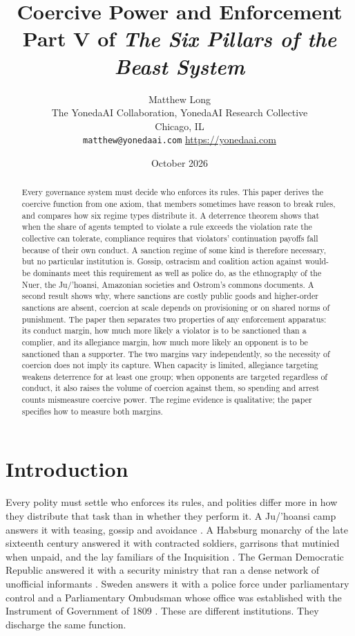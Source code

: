 \documentclass[11pt,letterpaper]{article}
\title{Coercive Power and Enforcement\\[4pt]
  {\normalsize Part V of \emph{The Six Pillars of the Beast System}}}
\author{Matthew Long\\
  \small The YonedaAI Collaboration, YonedaAI Research Collective\\
  \small Chicago, IL\\
  \small \texttt{matthew@yonedaai.com} \quad \url{https://yonedaai.com}}
\date{October 2026}
\theoremstyle{definition}
\theoremstyle{remark}
\begin{document}
\maketitle

\begin{abstract}
Every governance system must decide who enforces its rules. This paper derives the coercive function from one axiom, that members sometimes have reason to break rules, and compares how six regime types distribute it. A deterrence theorem shows that when the share of agents tempted to violate a rule exceeds the violation rate the collective can tolerate, compliance requires that violators' continuation payoffs fall because of their own conduct. A sanction regime of some kind is therefore necessary, but no particular institution is. Gossip, ostracism and coalition action against would-be dominants meet this requirement as well as police do, as the ethnography of the Nuer, the Ju/'hoansi, Amazonian societies and Ostrom's commons documents. A second result shows why, where sanctions are costly public goods and higher-order sanctions are absent, coercion at scale depends on provisioning or on shared norms of punishment. The paper then separates two properties of any enforcement apparatus: its conduct margin, how much more likely a violator is to be sanctioned than a complier, and its allegiance margin, how much more likely an opponent is to be sanctioned than a supporter. The two margins vary independently, so the necessity of coercion does not imply its capture. When capacity is limited, allegiance targeting weakens deterrence for at least one group; when opponents are targeted regardless of conduct, it also raises the volume of coercion against them, so spending and arrest counts mismeasure coercive power. The regime evidence is qualitative; the paper specifies how to measure both margins.
\end{abstract}

\section{Introduction}
\label{sec:intro}

Every polity must settle who enforces its rules, and polities differ more in how they distribute that task than in whether they perform it. A Ju/'hoansi camp answers it with teasing, gossip and avoidance \citep{lee2013,wiessner2005}. A Habsburg monarchy of the late sixteenth century answered it with contracted soldiers, garrisons that mutinied when unpaid, and the lay familiars of the Inquisition \citep{parker1972,thompson1976,kamen1997}. The German Democratic Republic answered it with a security ministry that ran a dense network of unofficial informants \citep{gieseke2014}. Sweden answers it with a police force under parliamentary control and a Parliamentary Ombudsman whose office was established with the Instrument of Government of 1809 \citep{jo2026}. These are different institutions. They discharge the same function.
\end{document}

